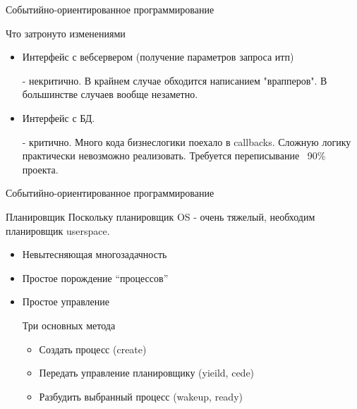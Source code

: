 \documentclass[aspectratio=169]{beamer}
\begin{document}
\begin{frame}{Событийно-ориентированное программирование}
    \begin{block}{Что затронуто изменениями}
        \begin{itemize}
            \pause\item Интерфейс с вебсервером (получение параметров запроса итп)
                \pause\par - некритично.
                    В крайнем случае обходится написанием "врапперов".
                    В большинстве случаев вообще незаметно.
            \pause\item Интерфейс с БД.
                \pause\par - критично. 
                    Много кода бизнеслогики поехало в callbacks. Сложную логику
                    практически невозможно реализовать.
                    Требуется переписывание ~90\% проекта.
        \end{itemize}
    \end{block}
\end{frame}

\begin{frame}{Событийно-ориентированное программирование}
    \begin{block}{Планировщик}
        Поскольку планировщик OS - очень тяжелый, необходим планировщик userspace.
        \begin{itemize}
            \pause\item Невытесняющая многозадачность
            \pause\item Простое порождение ``процессов''
            \pause\item Простое управление
                \pause\par Три основных метода
                \begin{itemize}
                    \pause\item Создать процесс (create)
                    \pause\item Передать управление планировщику (yieild, cede)
                    \pause\item Разбудить выбранный процесс (wakeup, ready)
                \end{itemize}
        \end{itemize}
    \end{block}
\end{frame}
\end{document}
